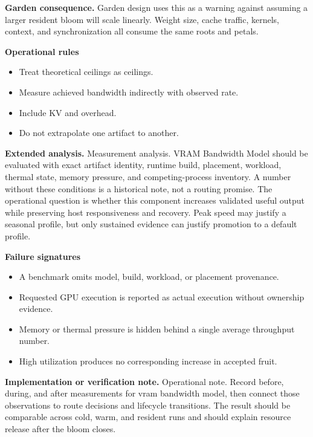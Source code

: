 \documentclass[10pt,letterpaper,oneside]{article}
\begin{document}
\textbf{Garden consequence.} Garden design uses this as a warning against assuming a larger resident bloom will scale linearly. Weight size, cache traffic, kernels, context, and synchronization all consume the same roots and petals.

\textbf{Operational rules}
\begin{itemize}
\item Treat theoretical ceilings as ceilings.
\item Measure achieved bandwidth indirectly with observed rate.
\item Include KV and overhead.
\item Do not extrapolate one artifact to another.
\end{itemize}
\textbf{Extended analysis.} Measurement analysis. VRAM Bandwidth Model should be evaluated with exact artifact identity, runtime build, placement, workload, thermal state, memory pressure, and competing-process inventory. A number without these conditions is a historical note, not a routing promise. The operational question is whether this component increases validated useful output while preserving host responsiveness and recovery. Peak speed may justify a seasonal profile, but only sustained evidence can justify promotion to a default profile.

\textbf{Failure signatures}
\begin{itemize}
\item A benchmark omits model, build, workload, or placement provenance.
\item Requested GPU execution is reported as actual execution without ownership evidence.
\item Memory or thermal pressure is hidden behind a single average throughput number.
\item High utilization produces no corresponding increase in accepted fruit.
\end{itemize}
\textbf{Implementation or verification note.} Operational note. Record before, during, and after measurements for vram bandwidth model, then connect those observations to route decisions and lifecycle transitions. The result should be comparable across cold, warm, and resident runs and should explain resource release after the bloom closes.
\end{document}
